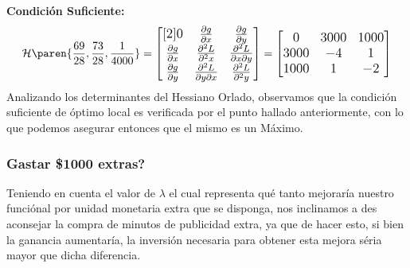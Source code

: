\begin{homeworkProblem}[-1][Publicidad]
\textbf{Condición Suficiente:}\\
\begin{align*}
    \mathcal{H}\paren{\frac{69}{28},\frac{73}{28},\frac{1}{4000}}=
    \large{\begin{bmatrix}[2]
        0 & \frac{\partial g}{\partial x}  & \frac{\partial g}{\partial y} \\
         \frac{\partial g}{\partial x}  & \frac{\partial^2 L}{\partial^2 x} & \frac{\partial^2 L}{\partial x \partial y} \\
         \frac{\partial g}{\partial y} & \frac{\partial^2 L}{\partial y \partial x}& \frac{\partial^2 L }{\partial^2 y } 
    \end{bmatrix}} = \begin{bmatrix}
       0 & 3000 & 1000 \\
       3000 & -4 & 1 \\
       1000 & 1 & -2
    \end{bmatrix}
\end{align*}
Analizando los determinantes del Hessiano Orlado, observamos que la condición suficiente de óptimo local es verificada por el punto hallado anteriormente, con lo que podemos asegurar entonces que el mismo es un Máximo.

\subsubsection{Gastar \$1000 extras?}
Teniendo en cuenta el valor de $\lambda$ el cual representa qué tanto mejoraría nuestro funciónal por unidad monetaria extra que se disponga,
nos inclinamos a des aconsejar la compra de minutos de publicidad extra, ya que de hacer esto, si bien la ganancia aumentaría, la inversión necesaria para obtener esta mejora séria mayor que dicha diferencia.

\end{homeworkProblem}